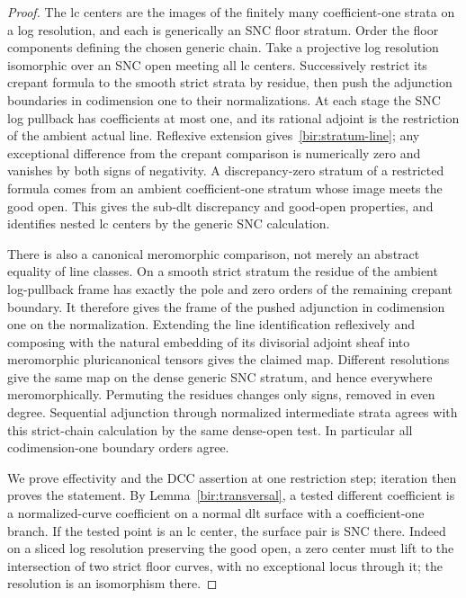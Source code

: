 \begin{proof}
The lc centers are the images of the finitely many coefficient-one
strata on a log resolution, and each is generically an SNC floor
stratum.  Order the floor components defining the chosen generic
chain.  Take a projective log resolution isomorphic over an SNC
open meeting all lc centers.  Successively restrict its crepant
formula to the smooth strict strata by residue, then push the
adjunction boundaries in codimension one to their normalizations.
At each stage the SNC log pullback has coefficients at most one,
and its rational adjoint is the restriction of the ambient actual
line.  Reflexive extension gives~\eqref{bir:stratum-line}; any
exceptional difference from the crepant comparison is numerically
zero and vanishes by both signs of negativity.  A discrepancy-zero
stratum of a restricted formula comes from an ambient
coefficient-one stratum whose image meets the good open.  This gives
the sub-dlt discrepancy and good-open properties, and identifies
nested lc centers by the generic SNC calculation.

There is also a canonical meromorphic comparison, not merely an
abstract equality of line classes.  On a smooth strict stratum the
residue of the ambient log-pullback frame has exactly the pole and
zero orders of the remaining crepant boundary.  It therefore gives
the frame of the pushed adjunction in codimension one on the
normalization.  Extending the line identification reflexively and
composing with the natural embedding of its divisorial adjoint
sheaf into meromorphic pluricanonical tensors gives the claimed
map.  Different resolutions give the same map on the dense generic
SNC stratum, and hence everywhere meromorphically.  Permuting the
residues changes only signs, removed in even degree.  Sequential
adjunction through normalized intermediate strata agrees with this
strict-chain calculation by the same dense-open test.  In
particular all codimension-one boundary orders agree.

We prove effectivity and the DCC assertion at one restriction step;
iteration then proves the statement.  By
Lemma~\ref{bir:transversal}, a tested different coefficient is a
normalized-curve coefficient on a normal dlt surface with a
coefficient-one branch.  If the tested point is an lc center, the
surface pair is SNC there.  Indeed on a sliced log resolution
preserving the good open, a zero center must lift to the intersection
of two strict floor curves, with no exceptional locus through it;
the resolution is an isomorphism there.


\end{proof}
